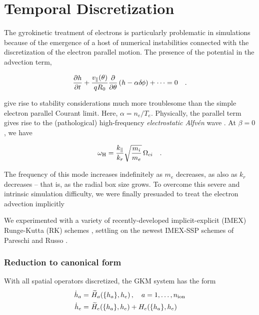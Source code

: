 \chapter{Temporal Discretization}\label{chap.time}

The gyrokinetic treatment of electrons is particularly 
problematic in simulations because of the emergence of 
a host of numerical instabilities connected with the 
discretization of the electron parallel motion.  The 
presence of the potential in the advection term, 

$$
\frac{\partial h}{\partial t} + \frac{v_\parallel(\theta)}{q R_0}
\frac{\partial}{\partial\theta}\left( h - \alpha \delta \hskip -1pt \phi \right) 
+ \cdots = 0 \quad .
$$

\noindent
give rise to stability considerations much more troublesome 
than the simple electron parallel Courant limit.
Here, $\alpha = n_e/T_e$.  Physically, the parallel term
gives rise to the (pathological) high-frequency 
{\it electrostatic Alfv\'en} wave \cite{lee:2001}.  
At $\beta=0$, we have

$$
\omega_{\rm H} = \frac{k_\parallel}{k_r} 
\sqrt{\frac{m_i}{m_e}} \, \Omega_{ci} \quad .$$

\noindent
The frequency of this mode increases indefinitely as 
$m_e$ decreases, as also as $k_r$ decreases -- that is, 
as the radial box size grows.  To overcome this severe
and intrinsic simulation difficulty, we were finally 
presuaded to treat the electron advection implicitly

We experimented with a variety of recently-developed 
implicit-explicit (IMEX) Runge-Kutta (RK) schemes 
\cite{ascher:1995,ascher:1997,pareschi:2000,pareschi:2002,
kennedy:2003}, settling on the newest IMEX-SSP schemes of 
Pareschi and Russo \cite{pareschi:2002}.

\subsection{Reduction to canonical form}

With all spatial operators discretized, the GKM system 
has the form
%
\begin{align}
{\dot h}_a = &~{\widetilde H}_a(\{h_a\},h_e) \, , 
  \quad a = 1, \ldots, n_{\rm ion} 
  \label{imexi} \\
{\dot h}_e    = &~{\widetilde H}_e(\{h_a\},h_e) + H_e(\{h_a\},h_e) 
  \label{imexe}
\end{align}

